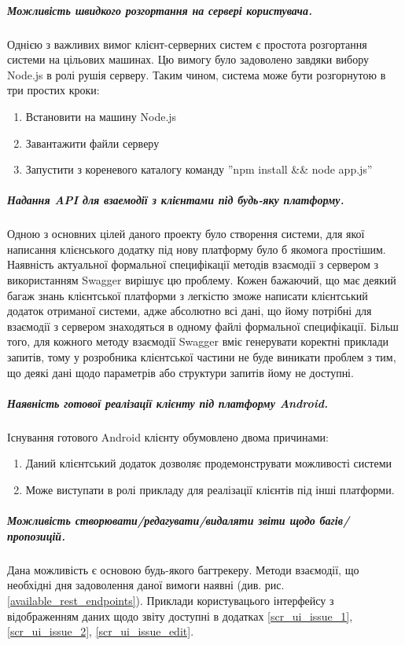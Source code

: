 \documentclass[../main.tex]{subfiles}
\begin{document}
\subparagraph{Можливість швидкого розгортання на сервері користувача.}
Однією з важливих вимог клієнт-серверних систем є простота розгортання системи на цільових машинах. Цю вимогу було задоволено завдяки вибору Node.js в ролі рушія серверу. Таким чином, система може бути розгорнутою в три простих кроки:
\begin{enumerate}
	\item Встановити на машину Node.js
	\item Завантажити файли серверу
	\item Запустити з кореневого каталогу команду ''npm install \&\& node app.js''
\end{enumerate}

\subparagraph{Надання API для взаемодії з клієнтами під будь-яку платформу.}
Одною з основних цілей даного проекту було створення системи, для якої написання клієнського додатку під нову платформу було б якомога простішим. Наявність актуальної формальної специфікації методів взаємодії з сервером з використанням Swagger вирішує цю проблему. Кожен бажаючий, що має деякий багаж знань клієнтської платформи з легкістю зможе написати клієнтський додаток отриманої системи, адже абсолютно всі дані, що йому потрібні для взаємодії з сервером знаходяться в одному файлі формальної специфікації. Більш того, для кожного методу взаємодії Swagger вміє генерувати коректні приклади запитів, тому у розробника клієнтської частини не буде виникати проблем з тим, що деякі дані щодо параметрів або структури запитів йому не доступні.

\subparagraph{Наявність готової реалізації клієнту під платформу Android.}
Існування готового Android клієнту обумовлено двома причинами:
\begin{enumerate}
	\item Даний клієнтський додаток дозволяє продемонструвати можливості системи
	\item Може виступати в ролі прикладу для реалізації клієнтів під інші платформи.
\end{enumerate}

\subparagraph{Можливість створювати/редагувати/видаляти звіти щодо багів/пропозицій.}
Дана можливість є основою будь-якого багтрекеру. Методи взаємодії, що необхідні дня задоволення даної вимоги наявні (див. рис. \ref{available_rest_endpoints}). Приклади користувацього інтерфейсу з відображенням даних щодо звіту доступні в додатках \ref{scr_ui_issue_1}, \ref{scr_ui_issue_2}, \ref{scr_ui_issue_edit}.
\end{document}
